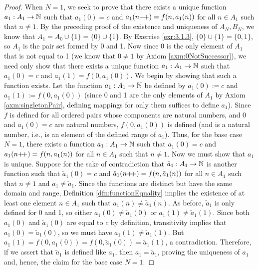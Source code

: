 \documentclass[../main.tex]{subfiles}
\begin{document}
\begin{enumerate}[ref={\thesection.\arabic*}]
\begin{proof}
        When $N=1$, we seek to prove that there exists a unique function $a_1:A_1\to\mathbb{N}$ such that $a_1(0)=c$ and $a_1(n{+\!+})=f(n,a_1(n))$ for all $n\in A_1$ such that $n\neq 1$. By the preceding proof of the existence and uniqueness of $A_N,B_N$, we know that $A_1=A_0\cup\{1\}=\{0\}\cup\{1\}$. By Exercise \ref{exr:3.1.3}, $\{0\}\cup\{1\}=\{0,1\}$, so $A_1$ is the pair set formed by 0 and 1. Now since 0 is the only element of $A_1$ that is not equal to 1 (we know that $0\neq 1$ by Axiom \ref{axm:0NotSuccessor}), we need only show that there exists a unique function $a_1:A_1\to\mathbb{N}$ such that $a_1(0)=c$ and $a_1(1)=f(0,a_1(0))$. We begin by showing that such a function exists. Let the function $a_1:A_1\to\mathbb{N}$ be defined by $a_1(0):=c$ and $a_1(1):=f(0,a_1(0))$ (since 0 and 1 are the only elements of $A_1$ by Axiom \ref{axm:singletonPair}, defining mappings for only them suffices to define $a_1$). Since $f$ is defined for all ordered pairs whose components are natural numbers, and 0 and $a_1(0)=c$ are natural numbers, $f(0,a_1(0))$ is defined (and is a natural number, i.e., is an element of the defined range of $a_1$). Thus, for the base case $N=1$, there exists a function $a_1:A_1\to\mathbb{N}$ such that $a_1(0)=c$ and $a_1(n{+\!+})=f(n,a_1(n))$ for all $n\in A_1$ such that $n\neq 1$. Now we must show that $a_1$ is unique. Suppose for the sake of contradiction that $\tilde{a}_1:A_1\to\mathbb{N}$ is another function such that $\tilde{a}_1(0)=c$ and $\tilde{a}_1(n{+\!+})=f(n,\tilde{a}_1(n))$ for all $n\in A_1$ such that $n\neq 1$ and $a_1\neq\tilde{a}_1$. Since the functions are distinct but have the same domain and range, Definition \ref{dfn:functionEquality} implies the existence of at least one element $n\in A_1$ such that $a_1(n)\neq\tilde{a}_1(n)$. As before, $\tilde{a}_1$ is only defined for 0 and 1, so either $a_1(0)\neq\tilde{a}_1(0)$ or $a_1(1)\neq\tilde{a}_1(1)$. Since both $a_1(0)$ and $\tilde{a}_1(0)$ are equal to $c$ by definition, transitivity implies that $a_1(0)=\tilde{a}_1(0)$, so we must have $a_1(1)\neq\tilde{a}_1(1)$. But $a_1(1)=f(0,a_1(0))=f(0,\tilde{a}_1(0))=\tilde{a}_1(1)$, a contradiction. Therefore, if we assert that $\tilde{a}_1$ is defined like $a_1$, then $a_1=\tilde{a}_1$, proving the uniqueness of $a_1$ and, hence, the claim for the base case $N=1$.\par

\end{proof}
\end{enumerate}
\end{document}
